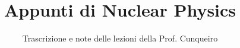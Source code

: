 \documentclass[a4paper,12pt]{article}
\title{Appunti di Nuclear Physics}
\author{Trascrizione e note delle lezioni della Prof. Cunqueiro}
\date{}
\begin{document}
\maketitle
\projectintro
\tableofcontents
\newpage

\end{document}
